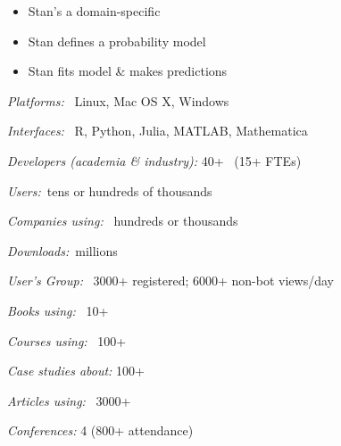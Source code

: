 \documentclass[10pt]{report}
\begin{document}
%
\begin{itemize}
\item Stan's a domain-specific 
\item Stan  defines a  probability model
\item Stan  fits model \& makes predictions
\end{itemize}


\begin{subitemize}
\item \textit{Platforms:} \ Linux, Mac OS X, Windows
\vspace*{-4pt}
\item \textit{Interfaces:} \ R, Python, Julia, MATLAB, Mathematica
\vspace*{-4pt}
\item \textit{Developers (academia \& industry):} 40+ \ {\small (15+ FTEs)}
\vspace*{-4pt}
\item \textit{Users:}\ tens or hundreds of thousands
\vspace*{-4pt}
\item \textit{Companies using:} \ hundreds or thousands
\vspace*{-4pt}
\item \textit{Downloads:}\ millions
\vspace*{-4pt}
\item \textit{User's Group:} \ 3000+ registered; 6000+ non-bot views/day
\vspace*{-4pt}
\item \textit{Books using:} \ 10+
\vspace*{-4pt}
\item \textit{Courses using:} \ 100+
\vspace*{-4pt}
\item \textit{Case studies about:} 100+
\vspace*{-4pt}
\item \textit{Articles using:} \ 3000+
\vspace*{-4pt}
\item \textit{Conferences:} 4 (800+ attendance)
\end{subitemize}
\end{document}
